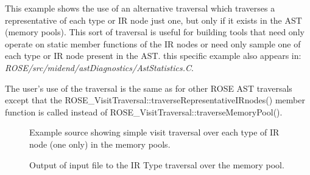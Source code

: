 This example shows the use of an alternative traversal which traverses a 
representative of each type or IR node just one, but only if it exists
in the AST (memory pools).  This sort of traversal is useful for building
tools that need only operate on static member functions of the IR nodes
or need only sample one of each type or IR node present in the AST.
this specific example also appears in:
     {\em ROSE/src/midend/astDiagnostics/AstStatistics.C}.

The user's use of the traversal is the same as for other ROSE AST traversals
except that the ROSE\_VisitTraversal::traverseRepresentativeIRnodes() member
function is called instead of ROSE\_VisitTraversal::traverseMemoryPool().

\begin{figure}[!h]
{\indent
{\mySmallFontSize

\begin{latexonly}
   
\end{latexonly}

\begin{htmlonly}
   
\end{htmlonly}

}
}
\caption{Example source showing simple visit traversal over each type of IR node (one only) in the memory pools.}
\label{Tutorial:exampleIRTypeMemoryPoolVisitorTraversal}
\end{figure}


\begin{figure}[!h]
{\indent
{\mySmallFontSize

\begin{latexonly}
   
\end{latexonly}

\begin{htmlonly}
   
\end{htmlonly}

}
}
\caption{Output of input file to the IR Type traversal over the memory pool.}
\label{Tutorial:exampleOutput_IRTypeMemoryPoolVisitorTraversal}
\end{figure}

